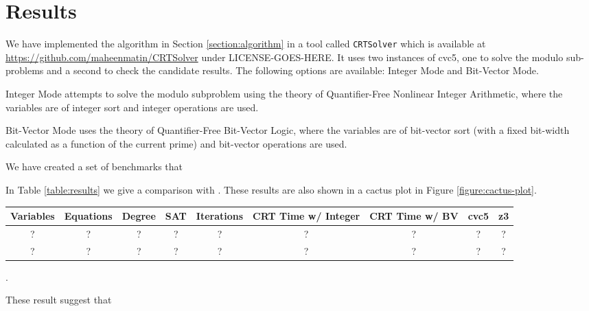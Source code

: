 \section{Results}
\label{section:results}

We have implemented the algorithm in Section \ref{section:algorithm}
in a tool called \texttt{CRTSolver} which is available at
\url{https://github.com/maheenmatin/CRTSolver} under LICENSE-GOES-HERE.
%
It uses two instances of cvc5, one to solve the modulo sub-problems
and a second to check the candidate results.  The following options
are available: Integer Mode and Bit-Vector Mode. 

Integer Mode attempts to
solve the modulo subproblem using the theory of Quantifier-Free Nonlinear
Integer Arithmetic, where the variables are of integer sort and integer
operations are used. 

Bit-Vector Mode uses the theory of Quantifier-Free
Bit-Vector Logic, where the variables are of bit-vector sort (with a fixed
bit-width calculated as a function of the current prime) and bit-vector
operations are used. 

We have created a set of benchmarks that 

In Table \ref{table:results} we give a comparison with .
These results are also shown in a cactus plot in Figure \ref{figure:cactus-plot}.


\begin{table*}
  \caption{Performance Comparison between CRTSolver and ... }
  \label{table:results}
  \begin{tabular}{ccccccccc}
    \toprule
    Variables & Equations & Degree & SAT & Iterations & CRT Time w/ Integer & CRT Time w/ BV & cvc5 & z3 \\
    \midrule
    ? & ? & ? & ? & ? & ? & ? & ? & ? \\
    ? & ? & ? & ? & ? & ? & ? & ? & ? \\
  \bottomrule
\end{tabular}
\end{table*}

\begin{figure*}
  \caption{A cactus plot of the results.}
  \label{figure:cactus-plot}.
\end{figure*}

These result suggest that 
